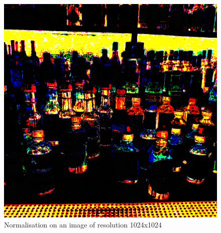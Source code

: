 \documentclass[runningheads, a4paper, oribibl]{llncs}
\begin{document}
\begin{figure}[h!]
    \centering
    \includegraphics[scale = 0.4]{q1/norm.png}
    \caption{Normalisation on an image of resolution 1024x1024}
    \label{fig:2}
\end{figure}
\end{document}
